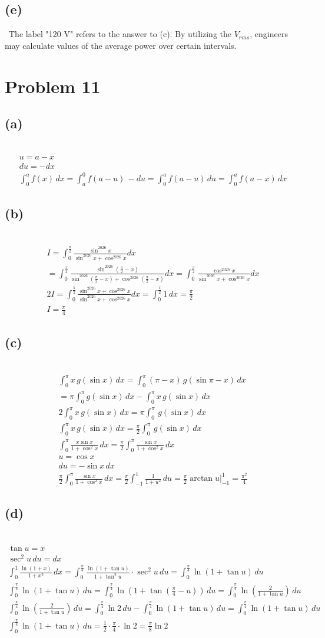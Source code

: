 \documentclass[12pt]{article}
\newcommand{\problem}[1]{\section{Problem #1}}
\newcommand{\subproblem}[1]{\subsection{(#1)} \,}
\begin{document}
\subproblem{e}
The label "120 V" refers to the answer to (c). By utilizing the $V_{rms}$, engineers may calculate values of the average power over certain intervals. 

\problem{11}

\subproblem{a}
\begin{gather*}
    u=a-x\\
    du=-dx\\
    \int_0^af(x)\, dx=\int_a^0f(a-u)\, -du=\int_0^af(a-u)\, du=\int_0^af(a-x)\,d x
\end{gather*}

\subproblem{b}
\begin{gather*}
    I=\int_0^\frac{\pi}{2}\frac{\sin^{2026}x}{\sin^{2026} x+\cos^{2026}x}dx\\=\int_0^\frac{\pi}{2}\frac{\sin^{2026}(\frac{\pi}{2}-x)}{\sin^{2026} (\frac{\pi}{2}-x)+\cos^{2026}(\frac{\pi}{2}-x)}dx=\int_0^\frac{\pi}{2}\frac{\cos^{2026}x}{\sin^{2026} x+\cos^{2026}x}dx\\
    2I=\int_0^\frac{\pi}{2}\frac{\sin^{2026} x+\cos^{2026}x}{\sin^{2026} x+\cos^{2026}x}dx=\int_0^\frac{\pi}{2}1\, dx=\frac{\pi}{2}\\
    \boxed{I=\frac{\pi}{4}}
\end{gather*}

\subproblem{c}
\begin{gather*}
    \int_0^\pi x\, g(\sin x)\, dx= \int_0^\pi (\pi -x)\, g(\sin \pi -x)\, dx\\=\pi \int_0^\pi g(\sin x)\,d x-\int_0^\pi x\, g(\sin x)\, dx\\
    2\int_0^\pi x\, g(\sin x)\, dx=\pi \int_0^\pi \, g(\sin x)\, dx\\
    \int_0^\pi x\, g(\sin x)\, dx=\frac{\pi}{2} \int_0^\pi \, g(\sin x)\, dx\\
    \int_0^\pi \frac{x\sin x}{1+\cos^2x}\, dx=\frac{\pi}{2} \int_0^\pi \frac{\sin x}{1+\cos^2 x}\, dx\\
    u=\cos x\\
    du=-\sin x \, dx\\
    \frac{\pi}{2} \int_0^\pi \frac{\sin x}{1+\cos^2 x}\, dx=\frac{\pi}{2} \int_{-1}^1 \frac{1}{1+u^2}\, du=\frac{\pi}{2} \arctan u \Big|^1_{-1}=\boxed{\frac{\pi^2}{4}}
\end{gather*}

\subproblem{d}
\begin{gather*}
    \tan u=x\\
    \sec^2 u\, du=dx\\
    \int_0^1\frac{\ln(1+x)}{1+x^2}\,dx =\int_0^\frac{\pi}{4} \frac{\ln (1+\tan u)}{1+\tan^2u}\cdot \sec^2u\, du=\int_0^\frac{\pi}{4}\ln (1+\tan u)\, du\\
    \int_0^\frac{\pi}{4}\ln (1+\tan u)\, du=\int_0^\frac{\pi}{4}\ln (1+\tan (\frac{\pi}{4}-u))\, du = \int_0^\frac{\pi}{4}\ln (\frac{2}{1+\tan u})\, du\\
    \int_0^\frac{\pi}{4}\ln (\frac{2}{1+\tan u})\, du=\int_0^\frac{\pi}{4}\ln 2 \, du-\int_0^\frac{\pi}{4} \ln (1+\tan u)\, du=\int_0^\frac{\pi}{4} \ln (1+\tan u)\, du\\
    \int_0^\frac{\pi}{4} \ln (1+\tan u)\, du= \frac{1}{2}\cdot \frac{\pi}{4}\cdot \ln 2 = \boxed{\frac{\pi}{8}\ln 2}
\end{gather*}
\end{document}
